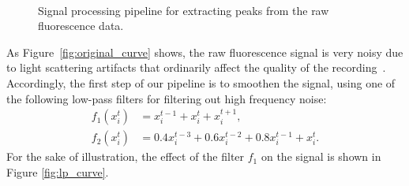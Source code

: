 \documentclass[wcp]{jmlr}
\begin{document}
\begin{figure}
\centering
{}
\\
\caption{Signal processing pipeline for extracting peaks from the raw fluorescence data.}
\label{fig:filtered-signal}
\end{figure}

As Figure~\ref{fig:original_curve} shows, the raw
fluorescence signal is very noisy due to light scattering artifacts that
ordinarily affect the quality of the recording~\citep{lichtman2011big}.
Accordingly, the first step of our pipeline is to smoothen the signal, using
one of the following low-pass filters for filtering out high frequency noise:
\begin{align}
f_1(x^t_i) &= x^{t-1}_i + x^t_i + x^{t+1}_i \label{eq:symetric-median}, \\
f_2(x^t_i) &= 0.4 x^{t-3}_i + 0.6 x^{t-2}_i + 0.8 x^{t-1}_i + x_i^t.
\label{eq:weighted-asymetric-median}
\end{align}
For the sake of illustration, the effect of the filter $f_1$ on the signal
is shown in Figure \ref{fig:lp_curve}.
\end{document}
